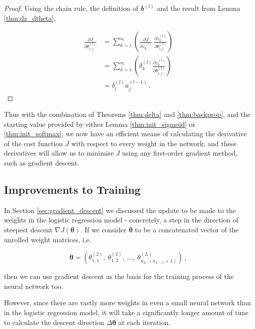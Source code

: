 \documentclass{article}[11pt]
\begin{document}
        \begin{proof}
        
            Using the chain rule, the definition of $\boldsymbol{\delta}^{(l)}$ and the result from Lemma \ref{thm:dz_dtheta},
            
            $$ \begin{aligned}
            \frac{\partial J}{\partial \theta^{(l)}_{i,j}}
            &= \sum_{k=1}^{n_l} \left( \frac{\partial J}{\partial z^{(l)}_k} \ \frac{\partial z^{(l)}_k}{\partial \theta^{(l)}_{i,j}} \right) \\
            &= \sum_{k=1}^{n_l} \left( \delta^{(l)}_k \frac{\partial z^{(l)}_k}{\partial \theta^{(l)}_{i,j}} \right) \\
            &= \delta^{(l)}_i a^{(l-1)}_j \,.
            \end{aligned}$$
        
        \end{proof}
        
        
        Thus with the combination of Theorems \ref{thm:delta} and \ref{thm:backprop}, and the starting value provided by either Lemma \ref{thm:init_sigmoid} or \ref{thm:init_softmax}, we now have an efficient means of calculating the derivative of the cost function $J$ with respect to every weight in the network; and these derivatives will allow us to minimise $J$ using any first-order gradient method, such as gradient descent.
        
        

    \subsection{Improvements to Training} \label{sec:improvements}
        
        In Section \ref{sec:gradient_descent} we discussed the update to be made to the weights in the logistic regression model - concretely, a step in the direction of steepest descent $\nabla J(\boldsymbol{\theta})$. If we consider $\boldsymbol{\theta}$ to be a concatenated vector of the unrolled weight matrices, i.e.
        
        $$
        \boldsymbol{\theta} = \left( \theta^{(2)}_{1,1}, \ \theta^{(2)}_{1,2}, \ \ldots, \ \theta^{(L)}_{n_L, (n_{L-1}+1)} \right) \,,
        $$
        
        then we can use gradient descent as the basis for the training process of the neural network too.
        
        However, since there are vastly more weights in even a small neural network than in the logistic regression model, it will take a significantly longer amount of time to calculate the descent direction $\Delta \boldsymbol{\theta}$ at each iteration.
        
\end{document}
